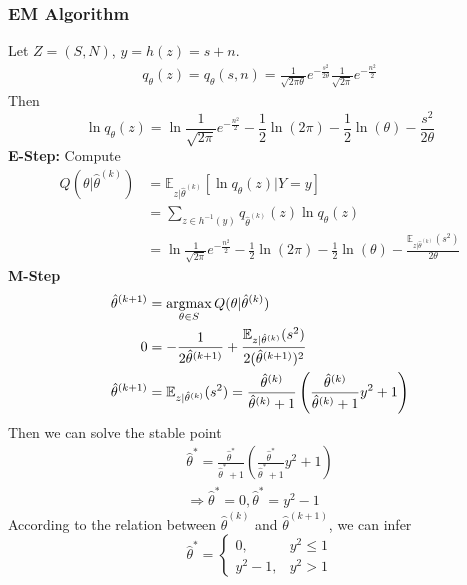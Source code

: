 \documentclass[11pt,a4paper]{article}
\newcommand{\argmax}{\operatornamewithlimits{argmax}}
\begin{document}
\subsubsection{EM Algorithm}
Let $Z=(S,N)$, $y=h(z)=s+n$.
\begin{equation}
    \begin{aligned}
        q_\theta(z)=q_\theta(s,n)=\frac{1}{\sqrt{2\pi\theta}}e^{-\frac{s^2}{2\theta}}\frac{1}{\sqrt{2\pi}}e^{-\frac{n^2}{2}}
    \end{aligned}
    \nonumber
\end{equation}
Then $$\ln q_\theta(z)=\ln \frac{1}{\sqrt{2\pi}}e^{-\frac{n^2}{2}}-\frac{1}{2}\ln (2\pi)-\frac{1}{2}\ln(\theta)-\frac{s^2}{2\theta}$$
\textbf{E-Step:}
        Compute
        \begin{equation}
            \begin{aligned}
                Q(\theta|\hat{\theta}^{(k)})
                &=\mathbb{E}_{z|\hat{\theta}^{(k)}}[\ln q_\theta(z)|Y=y]\\
                &=\sum_{z\in h^{-1}(y)}q_{\hat{\theta}^{(k)}}(z)\ln q_\theta(z)\\
                &=\ln \frac{1}{\sqrt{2\pi}}e^{-\frac{n^2}{2}}-\frac{1}{2}\ln (2\pi)-\frac{1}{2}\ln(\theta)-\frac{\mathbb{E}_{z|\hat{\theta}^{(k)}}(s^2)}{2\theta}
            \end{aligned}
            \nonumber
        \end{equation}
\textbf{M-Step}
\begin{equation}
    \begin{aligned}
        \hat{\theta}^{(k+1)}&=\argmax_{\theta\in S}Q(\theta|\hat{\theta}^{(k)})\\
        0&=-\frac{1}{2\hat{\theta}^{(k+1)}}+\frac{\mathbb{E}_{z|\hat{\theta}^{(k)}}(s^2)}{2(\hat{\theta}^{(k+1)})^2}\\
        \hat{\theta}^{(k+1)}&=\mathbb{E}_{z|\hat{\theta}^{(k)}}(s^2)=\frac{\hat{\theta}^{(k)}}{\hat{\theta}^{(k)}+1}\left(\frac{\hat{\theta}^{(k)}}{\hat{\theta}^{(k)}+1}y^2+1\right)
    \end{aligned}
    \nonumber
\end{equation}
Then we can solve the stable point
\begin{equation}
    \begin{aligned}
        \hat{\theta}^{*}=\frac{\hat{\theta}^{*}}{\hat{\theta}^{*}+1}\left(\frac{\hat{\theta}^{*}}{\hat{\theta}^{*}+1}y^2+1\right)\\
        \Rightarrow \hat{\theta}^{*}=0, \hat{\theta}^{*}=y^2-1
    \end{aligned}
    \nonumber
\end{equation}
According to the relation between $\hat{\theta}^{(k)}$ and $\hat{\theta}^{(k+1)}$, we can infer
$$\hat{\theta}^*=\left\{\begin{matrix}
    0,&y^2\leq 1\\
    y^2-1,&y^2>1
\end{matrix}\right.$$
\end{document}
